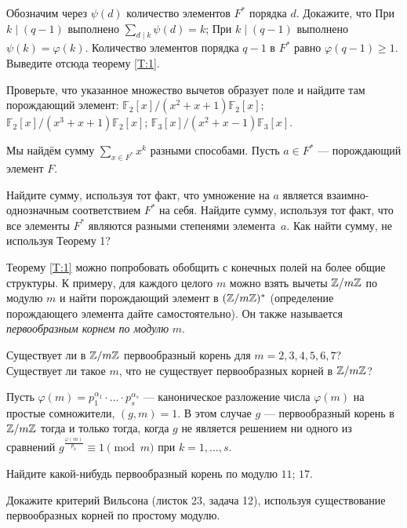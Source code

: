 \documentclass[a4paper,12pt]{article}
\begin{document}

 Обозначим через $\psi(d)$ количество элементов $F^*$ порядка $d$. Докажите, что 
 При $k \mid (q-1)$ выполнено $\sum\limits_{d \mid k}\psi(d)=k$;
 При $k \mid (q-1)$ выполнено $\psi(k) = \varphi(k)$.
 Количество элементов порядка $q-1$ в $F^*$ равно $\varphi(q-1) \geq 1$. Выведите отсюда теорему \ref{T:1}.

 Проверьте, что указанное множество вычетов образует поле и найдите там порождающий элемент: \quad {} $\mathbb{F}_2 [x]/(x^2+x+1)\mathbb{F}_2 [x]$;  $\mathbb{F}_2 [x]/(x^3+x+1)\mathbb{F}_2 [x]$;  $\mathbb{F}_3 [x]/(x^2+x-1)\mathbb{F}_3 [x]$.


 Мы найдём сумму $\sum\limits_{x \in F^*} x^k$ разными способами. Пусть $a \in F^*$ --- порождающий элемент $F$.


 Найдите сумму, используя тот факт, что умножение на $a$ является взаимно-однозначным соответствием $F^*$ на себя.
 Найдите сумму, используя тот факт, что все элементы $F^*$  являются разными степенями элемента~$a$.
 Как найти сумму, не используя Теорему 1?

Теорему \ref{T:1} можно попробовать обобщить с конечных полей на более общие структуры. К примеру, для каждого целого $m$ можно взять вычеты $\mathbb{Z} / m\mathbb{Z}$ по модулю $m$ и найти порождающий элемент в $(\mathbb{Z}/m\mathbb{Z})^*$ (определение порождающего элемента дайте самостоятельно). Он также называется {\it первообразным корнем по модулю} $m$.

  Существует ли в $\mathbb{Z} / m\mathbb{Z}$ первообразный корень для $m=2,3,4,5,6,7$?\\
 Существует ли такое $m$, что не существует первообразных корней в $\mathbb{Z} / m\mathbb{Z}$?

 Пусть $\varphi(m) = p_1^{\alpha_1} \cdot \ldots \cdot p_s^{\alpha_s}$ --- каноническое разложение числа $\varphi(m)$ на простые сомножители, $(g,m)=1$. В этом случае $g$ --- первообразный корень в $\mathbb{Z}/m\mathbb{Z}$ тогда и только тогда, когда $g$ не является решением ни одного из сравнений $g^{\frac{\varphi(m)}{p_k}} \equiv 1 \pmod{m}$ при $k=1,\ldots,s$.

 Найдите какой-нибудь первообразный корень по модулю  $11$;  $17$.

 Докажите критерий Вильсона (листок 23, задача 12), используя существование первообразных корней по простому модулю.

\end{document}
